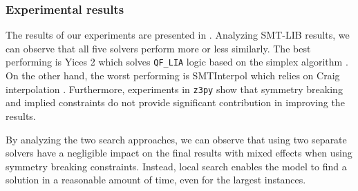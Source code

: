 \subsubsection{Experimental results}

The results of our experiments are presented in .
Analyzing SMT-LIB results, we can observe that all five solvers perform more or less similarly. The best performing is Yices 2 which solves \texttt{QF\_LIA} logic based on the simplex algorithm \cite{yices2}. On the other hand, the worst performing is SMTInterpol which relies on Craig interpolation \cite{smtinterpol}.
Furthermore, experiments in \texttt{z3py} show that symmetry breaking and implied constraints do not provide significant contribution in improving the results.

By analyzing the two search approaches, we can observe that using two separate solvers have a negligible impact on the final results with mixed effects when using symmetry breaking constraints. Instead, local search enables the model to find a solution in a reasonable amount of time, even for the largest instances.

